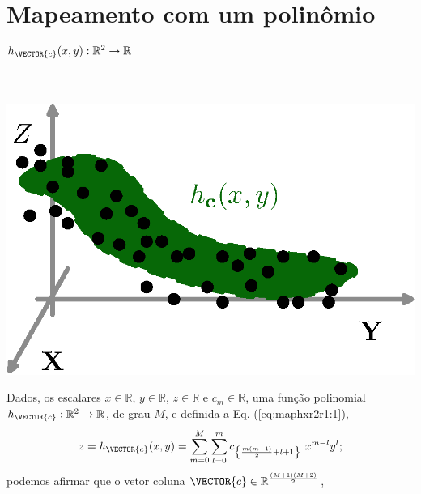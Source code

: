\section{Mapeamento com um polinômio $h_{\VECTOR{c}}(x,y):\mathbb{R}^2 \rightarrow \mathbb{R}$}

\begin{theorem}
\label{theo:maphxr2r1}
~\\
\begin{minipage}{0.4\textwidth}
\centering
\includegraphics[width=0.95\linewidth]{chapters/mapeamento/mapeamento-hx2.eps} 
\end{minipage}
\begin{minipage}{0.6\textwidth}
Dados,
os escalares $x \in \mathbb{R}$, $y \in \mathbb{R}$, $z \in \mathbb{R}$ e $c_m \in \mathbb{R}$,
uma função polinomial $h_{\VECTOR{c}}:\mathbb{R}^2 \rightarrow \mathbb{R}$, de grau $M$, e 
definida a Eq. (\ref{eq:maphxr2r1:1}),
\begin{equation}\label{eq:maphxr2r1:1}
z= h_{\VECTOR{c}}(x,y) = \sum \limits_{m=0}^{M} \sum \limits_{l=0}^{m}c_{\left\{ \frac{m(m+1)}{2}+l+1\right\}}~x^{m-l}y^{l}; 
\end{equation}
podemos afirmar que o vetor coluna $\VECTOR{c} \in \mathbb{R}^{\frac{(M+1)(M+2)}{2}}$,

\end{minipage}
\end{theorem}
